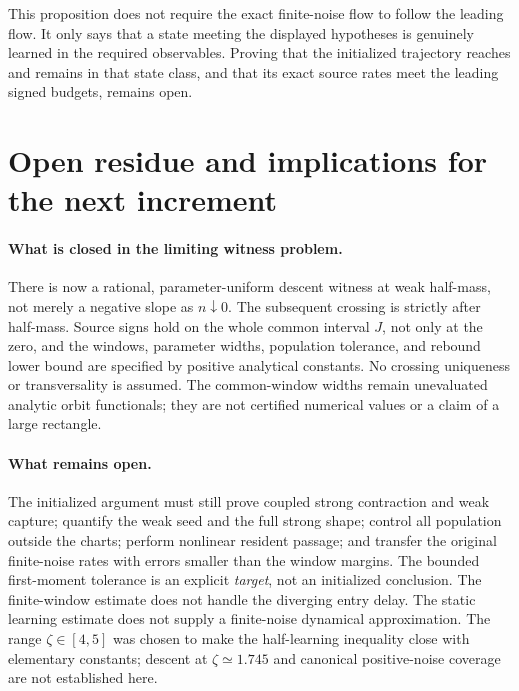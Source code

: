 \documentclass[11pt]{article}
\numberwithin{equation}{section}
\theoremstyle{remark}\newtheorem{remark}[theorem]{Remark}
\newcommand{\1}{\mathbf 1}
\begin{document}
This proposition does not require the exact finite-noise flow to follow
the leading flow. It only says that a state meeting the displayed
hypotheses is genuinely learned in the required observables. Proving that
the initialized trajectory reaches and remains in that state class, and
that its exact source rates meet the leading signed budgets, remains open.

\section{Open residue and implications for the next increment}
\label{inc:AN06:v1:residue}
\paragraph{What is closed in the limiting witness problem.}
There is now a rational, parameter-uniform descent witness at weak
half-mass, not merely a negative slope as $n\downarrow0$.
The subsequent crossing is strictly after half-mass. Source signs hold
on the whole common interval $J$, not only at the zero, and the windows,
parameter widths, population tolerance, and rebound lower bound are
specified by positive analytical constants. No crossing uniqueness or
transversality is assumed.
The common-window widths remain unevaluated analytic orbit functionals;
they are not certified numerical values or a claim of a large rectangle.

\paragraph{What remains open.}
The initialized argument must still prove coupled strong contraction and
weak capture; quantify the weak seed and the full strong shape;
control all population outside the charts; perform nonlinear resident
passage; and transfer the original finite-noise rates with errors smaller
than the window margins. The bounded first-moment tolerance is an explicit
\emph{target}, not an initialized conclusion. The finite-window estimate
does not handle the diverging entry delay. The static learning estimate
does not supply a finite-noise dynamical approximation.
The range $\zeta\in[4,5]$ was chosen to make the half-learning inequality
close with elementary constants; descent at $\zeta\simeq1.745$ and
canonical positive-noise coverage are not established here.
\end{document}
